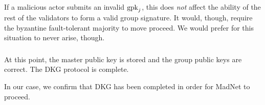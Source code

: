 If a malicious actor submits an invalid $\textrm{gpk}_{j}$,
this does \emph{not} affect the ability of the rest of the validators
to form a valid group signature.
It would, though, require the byzantine fault-tolerant majority
to move proceed.
We would prefer for this situation to never arise, though.



\subsubsection{\Completion{}}
\label{sssec:gpkj_complete}
At this point, the master public key is stored
and the group public keys are correct.
The DKG protocol is complete.

In our case, we confirm that DKG has been completed in order
for MadNet to proceed.


